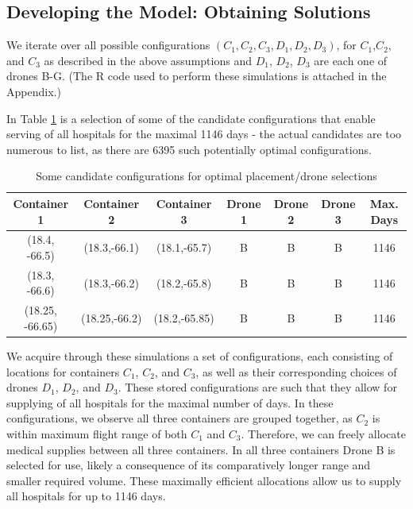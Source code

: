 \subsection{Developing the Model: Obtaining Solutions}
We iterate over all possible configurations $(C_1, C_2, C_3, D_1, D_2, D_3)$, for $C_1$,$C_2$, and $C_3$ as described in the above assumptions and $D_1$, $D_2$, $D_3$ are each one of drones B-G. (The R code used to perform these simulations is attached in the Appendix.)  

In Table \ref{tab:candidate_configs} is a selection of some of the candidate configurations that enable serving of all hospitals for the maximal 1146 days - the actual candidates are too numerous to list, as there are 6395 such potentially optimal configurations.

 \begin{table}[h]
    \centering
    \begin{tabular}{c|c|c|c|c|c||c}
    \hline Container 1 & Container 2 & Container 3 & Drone 1 & Drone 2 & Drone 3 & Max. Days \\
    \hline
    (18.4, -66.5) & (18.3,-66.1) & (18.1,-65.7) & B & B & B & 1146 \\
    (18.3, -66.6) & (18.3,-66.2) & (18.2,-65.8) & B & B & B & 1146 \\
    (18.25, -66.65) & (18.25,-66.2) & (18.2,-65.85) & B & B & B & 1146 \\
    \end{tabular}
    \caption{Some candidate configurations for optimal placement/drone selections}
    \label{tab:candidate_configs}
\end{table}
We acquire through these simulations a set of configurations, each consisting of locations for containers $C_1$, $C_2$, and $C_3$, as well as their corresponding choices of drones $D_1$, $D_2$, and $D_3$. These stored configurations are such that they allow for supplying of all hospitals for the maximal number of days. In these configurations, we observe all three containers are grouped together, as $C_2$ is within maximum flight range of both $C_1$ and $C_3$. Therefore, we can freely allocate medical supplies between all three containers. In all three containers Drone B is selected for use, likely a consequence of its comparatively longer range and smaller required volume. These maximally efficient allocations allow us to supply all hospitals for up to 1146 days.   

